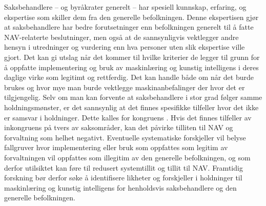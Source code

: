 \documentclass[
]{book}
\begin{document}
Saksbehandlere -- og byråkrater generelt -- har spesiell kunnskap, erfaring, og ekspertise som skiller dem fra den generelle befolkningen.
Denne ekspertisen gjør at saksbehandlere har bedre forutsetninger enn befolkningen generelt til å fatte NAV-relaterte beslutninger, men også at de sannsynligvis vektlegger andre hensyn i utredninger og vurdering enn hva personer uten slik ekspertise ville gjort.
Det kan gi utslag når det kommer til hvilke kriterier de legger til grunn for å oppfatte implementering og bruk av maskinlæring og kunstig intelligens i deres daglige virke som legitimt og rettferdig.
Det kan handle både om når det burde brukes og hvor mye man burde vektlegge maskinanbefalinger der hvor det er tilgjengelig.
Selv om man kan forvente at saksbehandlere i stor grad følger samme holdningsmønster, er det sannsynlig at det finnes spesifikke tilfeller hvor det ikke er samsvar i holdninger.
Dette kalles for kongruens \citep{golder2010ideological}.
Hvis det finnes tilfeller av inkongruens på tvers av saksområder, kan det påvirke tilliten til NAV og forvaltning som helhet negativt.
Eventuelle systematiske forskjeller vil belyse fallgruver hvor implementering eller bruk som oppfattes som legitim av forvaltningen vil oppfattes som illegitim av den generelle befolkningen, og som derfor utilsiktet kan føre til redusert systemtillit og tillit til NAV.
Framtidig forskning bør derfor søke å identifisere likheter og forskjeller i holdninger til maskinlæring og kunstig intelligens for henholdsvis saksbehandlere og den generelle befolkningen.

  
\end{document}
